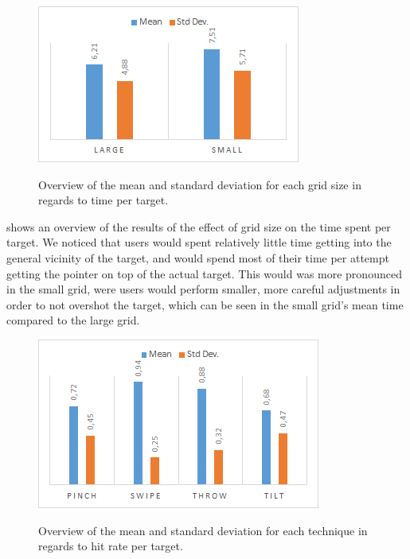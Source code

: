 \begin{figure}[H]
	{\includegraphics[width = 1\columnwidth ]{images/gridTimeResults.png}} 
	\caption{
		Overview of the mean and standard deviation for each grid size in regards to time per target.
	}
	\label{fig:gridtimeResults}
\end{figure}

 shows an overview of the results of the effect of grid size on the time spent per target. We noticed that users would spent relatively little time getting into the general vicinity of the target, and would spend most of their time per attempt getting the pointer on top of the actual target. This would was more pronounced in the small grid, were users would perform smaller, more careful adjustments in order to not overshot the target, which can be seen in the small grid's mean time compared to the large grid.

\begin{figure}[H]
	{\includegraphics[width = 1\columnwidth ]{images/techHitResults.png}} 
	\caption{
		Overview of the mean and standard deviation for each technique in regards to hit rate per target.
	}
	\label{fig:gridhitResults}
\end{figure}

